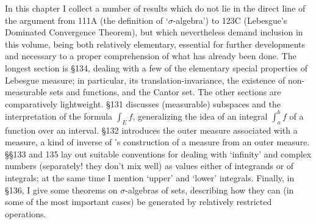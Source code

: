
\def\chaptername{Complements}
\def\sectionname{Introduction}


In this chapter I collect a number of results which do not lie in the
direct line of the argument from 111A (the definition of
`$\sigma$-algebra') to 123C (Lebesgue's Dominated Convergence
Theorem),
but which nevertheless demand inclusion in this volume, being both
relatively elementary, essential for further developments and necessary
to a proper comprehension of what has already been done.
The longest section is \S134, dealing with a few of the elementary
special properties of Lebesgue measure;  in particular, its
translation-invariance, the existence of non-measurable sets and
functions, and the Cantor set.   The other sections are comparatively
lightweight.   \S131 discusses (measurable) subspaces and the
interpretation of the formula $\int_Ef$, generalizing the idea of an
integral $\int_a^bf$ of a function over an interval.   \S132 introduces
the outer measure associated with a measure, a kind of inverse of
\Caratheodory's construction of a measure from an outer measure.
\S\S133 and 135 lay out suitable conventions for dealing with `infinity'
and complex numbers (separately!  they don't mix well) as values either
of integrands or of integrals;  at the same time I mention `upper'
and `lower' integrals.   Finally, in \S136, I give some theorems on
$\sigma$-algebras of sets, describing how they can (in some of the most
important cases) be generated by relatively restricted operations.

\discrpage

